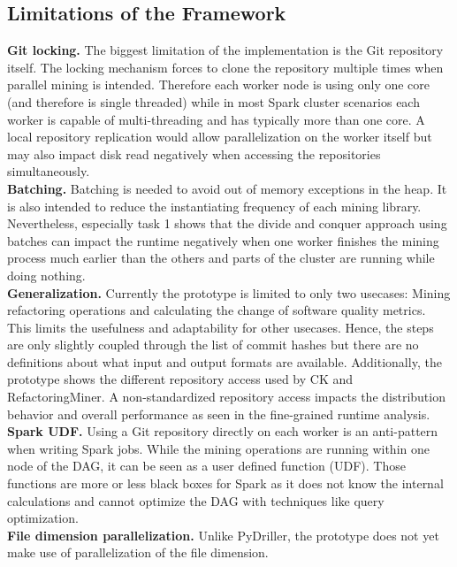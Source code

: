 \subsection{Limitations of the Framework}
\textbf{Git locking.} The biggest limitation of the \iris implementation is the Git repository itself. The locking mechanism forces to clone the repository multiple times when parallel mining is intended. Therefore each worker node is using only one core (and therefore is single threaded) while in most Spark cluster scenarios each worker is capable of multi-threading and has typically more than one core. A local repository replication would allow parallelization on the worker itself but may also impact disk read negatively when accessing the repositories simultaneously. \\
\textbf{Batching.} Batching is needed to avoid out of memory exceptions in the heap. It is also intended to reduce the instantiating frequency of each mining library. Nevertheless, especially task 1 shows that the divide and conquer approach using batches can impact the runtime negatively when one worker finishes the mining process much earlier than the others and parts of the cluster are running while doing nothing.\\
\textbf{Generalization.} Currently the prototype is limited to only two usecases: Mining refactoring operations and calculating the change of software quality metrics. This limits the usefulness and adaptability for other usecases. Hence, the steps are only slightly coupled through the list of commit hashes but there are no definitions about what input and output formats are available. Additionally, the prototype shows the different repository access used by CK and RefactoringMiner. A non-standardized repository access impacts the distribution behavior and overall performance as seen in the fine-grained runtime analysis.\\
\textbf{Spark UDF.} Using a Git repository directly on each worker is an anti-pattern when writing Spark jobs. While the mining operations are running within one node of the DAG, it can be seen as a user defined function (UDF). Those functions are more or less black boxes for Spark as it does not know the internal calculations and cannot optimize the DAG with techniques like query optimization.\\
\textbf{File dimension parallelization.} Unlike PyDriller, the prototype does not yet make use of parallelization of the file dimension.
\label{sec:limitations}
